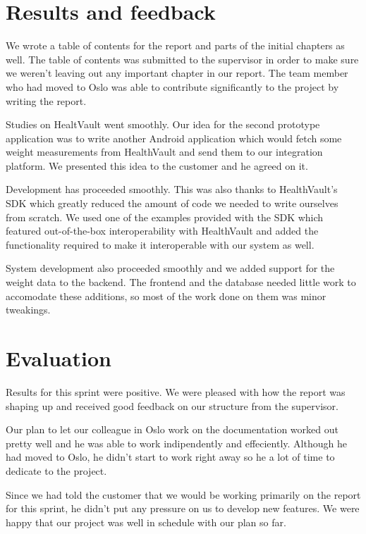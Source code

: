 \section{Results and feedback}

We wrote a table of contents for the report and parts of the initial chapters as well.
The table of contents was submitted to the supervisor in order to make sure we weren't leaving out
any important chapter in our report. The team member who had moved to Oslo was able to contribute
significantly to the project by writing the report.

Studies on HealtVault went smoothly. Our idea for the second prototype application was
to write another Android application which would fetch some weight measurements from HealthVault
and send them to our integration platform. We presented this idea to the customer and he agreed on it.

Development has proceeded smoothly. This was also thanks to HealthVault's SDK which greatly
reduced the amount of code we needed to write ourselves from scratch.
We used one of the examples provided with the SDK which featured out-of-the-box interoperability
with HealthVault and added the functionality required to make it interoperable with our system as well.

System development also proceeded smoothly and we added support for the weight data to the backend.
The frontend and the database needed little work to accomodate these additions, so most of the work done on
them was minor tweakings.

\section{Evaluation}

Results for this sprint were positive. We were pleased with how the report was shaping up and
received good feedback on our structure from the supervisor.

Our plan to let our colleague in Oslo work on the documentation worked out pretty well
and he was able to work indipendently and effeciently. Although he had moved to Oslo,
he didn't start to work right away so he a lot of time to dedicate to the project.

Since we had told the customer that we would be working primarily on the report for this sprint,
he didn't put any pressure on us to develop new features.
We were happy that our project was well in schedule with our plan so far.

